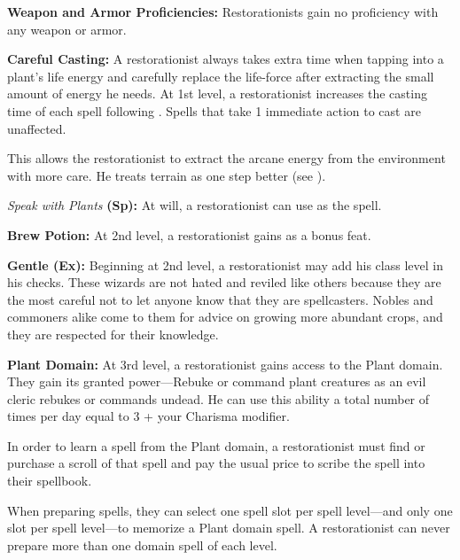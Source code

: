 {
\textbf{Weapon and Armor Proficiencies:} Restorationists gain no proficiency with any weapon or armor.

\textbf{Careful Casting:} A restorationist always takes extra time when tapping into a plant's life energy and carefully replace the life-force after extracting the small amount of energy he needs. At 1st level, a restorationist increases the casting time of each spell following . Spells that take 1 immediate action to cast are unaffected.


This allows the restorationist to extract the arcane energy from the environment with more care. He treats terrain as one step better (see ).

\textit{Speak with Plants} \textbf{(Sp):} At will, a restorationist can use  as the spell.

\textbf{Brew Potion:} At 2nd level, a restorationist gains  as a bonus feat.

\textbf{Gentle (Ex):} Beginning at 2nd level, a restorationist may add his class level in his  checks. These wizards are not hated and reviled like others because they are the most careful not to let anyone know that they are spellcasters. Nobles and commoners alike come to them for advice on growing more abundant crops, and they are respected for their knowledge.

\textbf{Plant Domain:} At 3rd level, a restorationist gains access to the Plant domain. They gain its granted power---Rebuke or command plant creatures as an evil cleric rebukes or commands undead. He can use this ability a total number of times per day equal to 3 + your Charisma modifier.

In order to learn a spell from the Plant domain, a restorationist must find or purchase a scroll of that spell and pay the usual price to scribe the spell into their spellbook. 

When preparing spells, they can select one spell slot per spell level---and only one slot per spell level---to memorize a Plant domain spell. A restorationist can never prepare more than one domain spell of each level.

}
